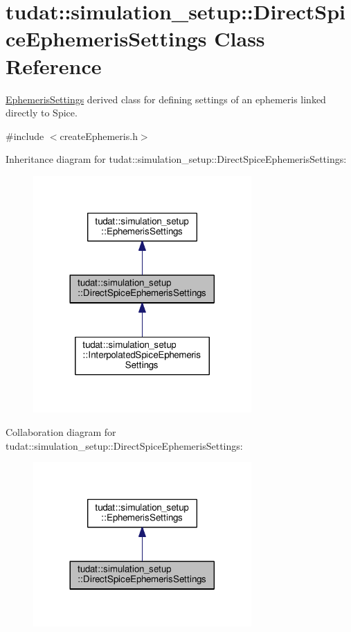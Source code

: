 \hypertarget{classtudat_1_1simulation__setup_1_1DirectSpiceEphemerisSettings}{}\section{tudat\+:\+:simulation\+\_\+setup\+:\+:Direct\+Spice\+Ephemeris\+Settings Class Reference}
\label{classtudat_1_1simulation__setup_1_1DirectSpiceEphemerisSettings}


\hyperlink{classtudat_1_1simulation__setup_1_1EphemerisSettings}{Ephemeris\+Settings} derived class for defining settings of an ephemeris linked directly to Spice.  




{\ttfamily \#include $<$create\+Ephemeris.\+h$>$}



Inheritance diagram for tudat\+:\+:simulation\+\_\+setup\+:\+:Direct\+Spice\+Ephemeris\+Settings\+:
\nopagebreak
\begin{figure}[H]
\begin{center}
\leavevmode
\includegraphics[width=236pt]{classtudat_1_1simulation__setup_1_1DirectSpiceEphemerisSettings__inherit__graph}
\end{center}
\end{figure}


Collaboration diagram for tudat\+:\+:simulation\+\_\+setup\+:\+:Direct\+Spice\+Ephemeris\+Settings\+:
\nopagebreak
\begin{figure}[H]
\begin{center}
\leavevmode
\includegraphics[width=236pt]{classtudat_1_1simulation__setup_1_1DirectSpiceEphemerisSettings__coll__graph}
\end{center}
\end{figure}
